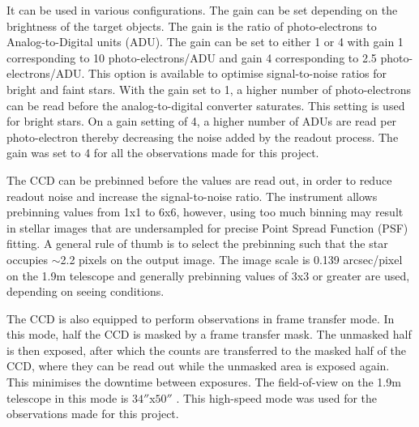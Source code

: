 It can be used in various configurations. The gain can be set depending on the brightness of the target objects. The gain is the ratio of photo-electrons to Analog-to-Digital units (ADU). The gain can be set to either 1 or 4 with gain 1 corresponding to 10 photo-electrons/ADU and gain 4 corresponding to 2.5 photo-electrons/ADU. This option is available to optimise signal-to-noise ratios for bright and faint stars. With the gain set to 1, a higher number of photo-electrons can be read before the analog-to-digital converter saturates. This setting is used for bright stars. On a gain setting of 4, a higher number of ADUs are read per photo-electron thereby decreasing the noise added by the readout process.  The gain was set to 4 for all the observations made for this project.

The CCD can be prebinned before the values are read out, in order to reduce readout noise and increase the signal-to-noise ratio. The instrument allows prebinning values from 1x1 to 6x6, however, using too much binning may result in stellar images that are undersampled for precise  Point Spread Function (PSF) fitting. A general rule of thumb is to  select the prebinning such that the star occupies $\sim$2.2 pixels on the output image. The image scale is 0.139 arcsec/pixel on the 1.9m telescope and generally prebinning values of 3x3 or greater are used, depending on seeing conditions.

The CCD is also equipped to perform observations in frame transfer mode. In this mode, half the CCD is masked by a frame transfer mask. The unmasked half is then exposed, after which the counts are transferred to the masked half of the CCD, where they can be read out while the unmasked area is exposed again. This minimises the downtime between exposures. The field-of-view on the 1.9m telescope in this mode is $34''$x$50''$ \citep{woudt2001HSP}. This high-speed mode was used for the observations made for this project.




